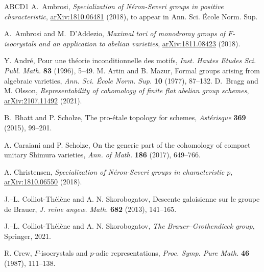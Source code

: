 \documentclass[11pt]{amsart}
\newcommand{\F}{\mathbb{F}}
\newcommand{\Ql}{\mathbb{Q}_{\ell}}
\begin{document}

\begin{thebibliography}{ABCD1}
 A.~Ambrosi, \textit{Specialization of Néron-Severi groups in positive characteristic}, \href{https://arxiv.org/abs/1810.06481
}{\url{arXiv:1810.06481}} (2018), to appear in Ann. Sci. École Norm. Sup.


	
	
	 A.~Ambrosi and M.~D'Addezio, \emph{Maximal tori of monodromy groups of $F$-isocrystals and an application to abelian varieties}, \href{https://arxiv.org/abs/1811.08423}{\url{arXiv:1811.08423}} (2018).
	
	Y. André, Pour une théorie inconditionnelle des motifs, \textit{Inst. Hautes Etudes Sci. Publ. Math.} 
	\textbf{83} (1996), 5--49.
	 M. Artin and B. Mazur, Formal groups arising from algebraic varieties,
	\textit{Ann. Sci. École Norm. Sup.} \textbf{10} (1977), 87--132.
		 D.~Bragg and M. Olsson, \emph{Representability of cohomology of finite flat abelian group schemes}, \href{https://arxiv.org/abs/2107.11492}{\url{arXiv:2107.11492}} (2021).
		
		B.~Bhatt and P. Scholze, The pro-\'etale topology for schemes, \textit{Ast\'erisque} \textbf{369} (2015), 99--201.


A. Caraiani and P. Scholze, On the generic part of the cohomology of compact unitary Shimura varieties, \textit{Ann. of Math.} \textbf{186} (2017), 649--766.
	
	A. Christensen, \textit{Specialization of Néron-Severi groups in characteristic $p$}, \href{https://arxiv.org/abs/1810.06550}{\url{arXiv:1810.06550}} (2018).
	
	
	 J.--L. Colliot-Thélène and A. N. Skorobogatov, Descente galoisienne sur le groupe de Brauer, \emph{J. reine angew. Math.} \textbf{682} (2013), 141--165.
	
	 J.--L. Colliot-Thélène and A. N. Skorobogatov, \textit{The Brauer--Grothendieck group}, Springer, 2021.
	
	R. Crew, $F$-isocrystals and $p$-adic representations, \textit{Proc. Symp. Pure Math.} \textbf{46} (1987), 111--138.
	

\end{thebibliography}
\end{document}
